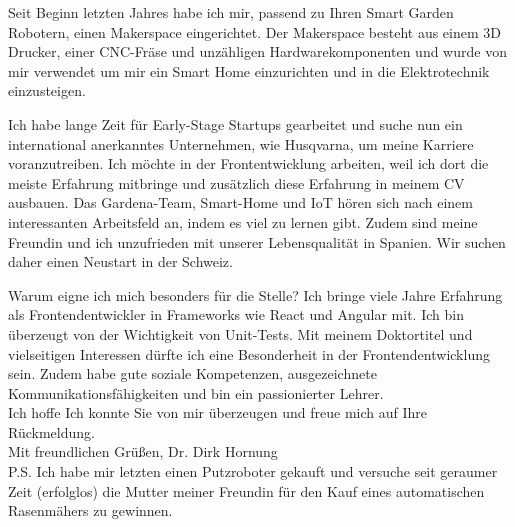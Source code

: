 \documentclass[11pt]{article}
\begin{document}
\noindent Seit Beginn letzten Jahres habe ich mir, passend zu Ihren Smart Garden
Robotern, einen Makerspace eingerichtet. Der Makerspace besteht aus einem 3D
Drucker, einer CNC-Fräse und unzähligen Hardwarekomponenten und wurde von mir
verwendet um mir ein Smart Home einzurichten und in die Elektrotechnik
einzusteigen.

\noindent Ich habe lange Zeit für Early-Stage Startups gearbeitet und suche nun
ein international anerkanntes Unternehmen, wie Husqvarna, um meine Karriere
voranzutreiben. Ich möchte in der Frontentwicklung arbeiten, weil ich dort die
meiste Erfahrung mitbringe und zusätzlich diese Erfahrung in meinem CV
ausbauen. Das Gardena-Team, Smart-Home und IoT hören sich nach einem
interessanten Arbeitsfeld an, indem es viel zu lernen gibt. Zudem sind meine
Freundin und ich unzufrieden mit unserer Lebensqualität in Spanien. Wir suchen
daher einen Neustart in der Schweiz.

\noindent Warum eigne ich mich besonders für die Stelle? Ich bringe viele Jahre
Erfahrung als Frontendentwickler in Frameworks wie React und Angular mit. Ich
bin überzeugt von der Wichtigkeit von Unit-Tests. Mit meinem Doktortitel und
vielseitigen Interessen dürfte ich eine Besonderheit in der
Frontendentwicklung sein. Zudem habe gute soziale Kompetenzen, 
ausgezeichnete Kommunikationsfähigkeiten und bin ein passionierter Lehrer. \\

\noindent Ich hoffe Ich konnte Sie von mir überzeugen und freue mich auf Ihre
Rückmeldung. \\

\noindent Mit freundlichen Grüßen, Dr. Dirk Hornung \\

\noindent P.S. Ich habe mir letzten einen Putzroboter gekauft und versuche seit
geraumer Zeit (erfolglos) die Mutter meiner Freundin für den Kauf eines automatischen
Rasenmähers zu gewinnen.

 
\end{document}
